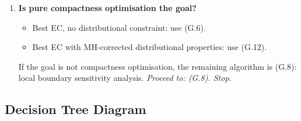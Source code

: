 \begin{enumerate}[label=\textbf{Q\arabic*.},start=3]
        If distributional calibration is not required, proceed to Q6.

  \item \textbf{Is pure compactness optimisation the goal?}

        \begin{itemize}
          \item Best EC, no distributional constraint: use \sburst{} (G.6).
          \item Best EC with MH-corrected distributional properties: use
                \sburstf{} (G.12).
        \end{itemize}

        If the goal is not compactness optimisation, the remaining algorithm
        is \flip{} (G.8): local boundary sensitivity analysis.
        \emph{Proceed to: \flip{} (G.8). Stop.}

\end{enumerate}

\subsection{Decision Tree Diagram}

